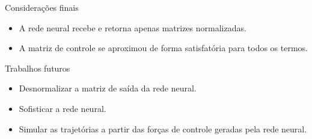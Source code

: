 \begin{frame}{Considerações finais}
\begin{itemize}
    \item[\bullet] A rede neural recebe e retorna apenas matrizes normalizadas.
    \item[\bullet] A matriz de controle se aproximou de forma satisfatória para todos os termos.
\end{itemize}
%
\begin{block}{Trabalhos futuros}
\begin{itemize}
    \item[\bullet] Desnormalizar a matriz de saída da rede neural.
    \item[\bullet] Sofisticar a rede neural.
    \item[\bullet] Simular as trajetórias a partir das forças de controle geradas pela rede neural.
\end{itemize}
\end{block}
\end{frame}
